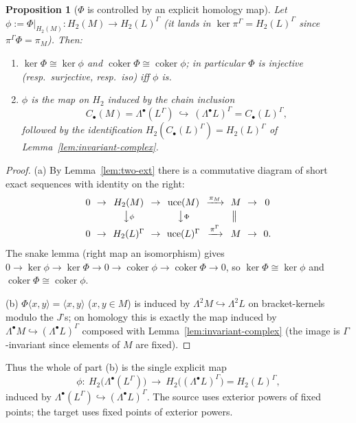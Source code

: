 \documentclass{amsart}
\newtheorem{proposition}{Proposition}
\theoremstyle{definition}
\DeclareMathOperator{\uce}{uce}
\newcommand{\Gm}{\Gamma}
\newcommand{\ra}{\rightarrow}
\begin{document}
\begin{proposition}[$\Phi$ is controlled by an explicit homology map]
\label{prop:snake}
Let $\phi:=\Phi|_{H_2(M)}\colon H_2(M)\ra H_2(L)^{\Gm}$ (it lands in
$\ker\pi^{\Gm}=H_2(L)^{\Gm}$ since $\pi^{\Gm}\Phi=\pi_M$).  Then:
\begin{enumerate}
\item[(a)] $\ker\Phi\cong\ker\phi$ and $\operatorname{coker}\Phi\cong
\operatorname{coker}\phi$; in particular $\Phi$ is injective (resp.\ surjective,
resp.\ iso) iff $\phi$ is.
\item[(b)] $\phi$ is the map on $H_2$ induced by the chain inclusion
\[
   C_\bullet(M)=\Lambda^\bullet(L^{\Gm})\ \hookrightarrow\ (\Lambda^\bullet L)^{\Gm}
   =C_\bullet(L)^{\Gm},
\]
followed by the identification $H_2(C_\bullet(L)^{\Gm})=H_2(L)^{\Gm}$ of
Lemma~\ref{lem:invariant-complex}.
\end{enumerate}
\end{proposition}
\begin{proof}
(a) By Lemma~\ref{lem:two-ext} there is a commutative diagram of short exact
sequences with identity on the right:
\[
\begin{array}{ccccccccc}
0 &\!\!\ra\!\!& H_2(M) &\!\!\ra\!\!& \uce(M) &\!\!\xrightarrow{\pi_M}\!\!& M &\!\!\ra\!\!& 0\\[2pt]
  &   & \big\downarrow{\scriptstyle\phi} & & \big\downarrow{\scriptstyle\Phi} & & \big\|\ & & \\[2pt]
0 &\!\!\ra\!\!& H_2(L)^{\Gm} &\!\!\ra\!\!& \uce(L)^{\Gm} &\!\!\xrightarrow{\pi^{\Gm}}\!\!& M &\!\!\ra\!\!& 0.
\end{array}
\]
The snake lemma (right map an isomorphism) gives
$0\ra\ker\phi\ra\ker\Phi\ra0\ra\operatorname{coker}\phi\ra
\operatorname{coker}\Phi\ra0$, so $\ker\Phi\cong\ker\phi$ and
$\operatorname{coker}\Phi\cong\operatorname{coker}\phi$.

(b) $\Phi\langle x,y\rangle=\langle x,y\rangle$ ($x,y\in M$) is induced by
$\Lambda^2M\hookrightarrow\Lambda^2L$ on bracket-kernels modulo the $J$'s; on
homology this is exactly the map induced by $\Lambda^\bullet M\hookrightarrow
(\Lambda^\bullet L)^{\Gm}$ composed with Lemma~\ref{lem:invariant-complex} (the
image is $\Gm$-invariant since elements of $M$ are fixed).
\end{proof}

Thus the whole of part (b) is the single explicit map
\begin{equation}\label{eq:phi}
   \phi\colon\ H_2\bigl(\Lambda^\bullet(L^{\Gm})\bigr)\ \longrightarrow\
   H_2\bigl((\Lambda^\bullet L)^{\Gm}\bigr)=H_2(L)^{\Gm},
\end{equation}
induced by $\Lambda^\bullet(L^{\Gm})\hookrightarrow(\Lambda^\bullet L)^{\Gm}$.
The source uses exterior powers of fixed points; the target uses fixed points of
exterior powers.
\end{document}
